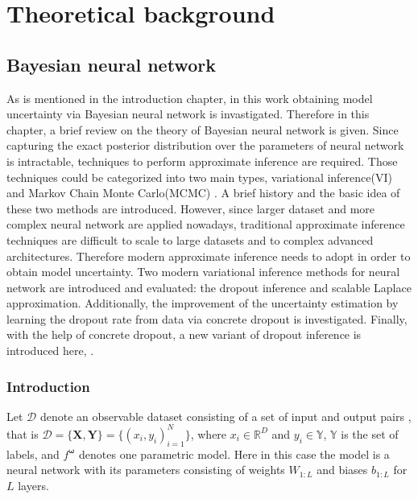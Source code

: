 \chapter{Theoretical background}


\section{Bayesian neural network}
As is mentioned in the introduction chapter, in this work obtaining model uncertainty via Bayesian neural network is invastigated. Therefore in this chapter, a brief review on the theory of Bayesian neural network is given. Since capturing the exact posterior distribution over the parameters of neural network is intractable, techniques to perform approximate inference are required. Those techniques could be categorized into two main types, variational inference(VI) and Markov Chain Monte Carlo(MCMC) . A brief history and the basic idea of these two methods are introduced. However, since larger dataset and more complex neural network are applied nowadays, traditional approximate inference techniques are difficult to scale to large datasets and to complex advanced architectures. Therefore modern approximate inference needs to adopt in order to obtain model uncertainty. Two modern variational inference methods for neural network are introduced and evaluated: the dropout inference\cite{gal2016dropout} and scalable Laplace approximation\cite{ritter2018scalable}. Additionally, the improvement of the uncertainty estimation by learning the dropout rate from data via concrete dropout \cite{gal2017concrete} is investigated. Finally, with the help of concrete dropout, a new variant of dropout inference is introduced here,  .

\subsection{Introduction}

Let $\mathcal{D}$ denote an observable dataset consisting of a set of input and output pairs , that is $\mathcal{D} = \{\mathbf{X}, \mathbf{Y}\} = \{(x_{i}, y_{i})_{i=1}^{N}\}$, where $x_{i}\in\mathbb{R}^{D}$ and $y_{i}\in\mathbb{Y}$, $\mathbb{Y}$ is the set of labels, and $f^{\boldsymbol{\omega}}$ denotes one parametric model.
Here in this case the model is a neural network with its parameters {\boldmath{$\omega$}} consisting of weights $W_{1:L}$ and biases $b_{1:L}$ for $L$ layers. 

